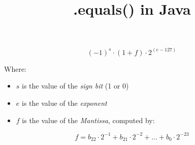 \documentclass{article}
\begin{document}
\title{.equals() in Java}

\noindent

{\Huge $$(-1)^s \cdot (1 + f) \cdot 2^{(e-127)}$$}

\noindent
Where:

\begin{itemize}
    \item $s$ is the value of the \textit{sign bit} (1 or 0)
    \item $e$ is the value of the \textit{exponent} 
    \item $f$ is the value of the \textit{Mantissa}, computed by:
\end{itemize}

{\Large $$ f = b_{22} \cdot 2^{-1} + b_{21} \cdot 2^{-2} + ... + b_{0} \cdot 2^{-23} $$}
\end{document}
